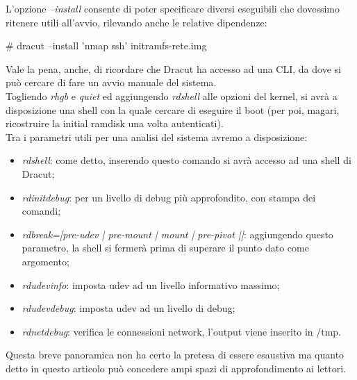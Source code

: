 L'opzione {\itshape --install} consente di poter specificare diversi eseguibili che dovessimo ritenere utili all'avvio, rilevando anche le relative dipendenze:

\begin{shaded}
{\color[cmyk]{0, 0, 0, 0}\# dracut --install 'nmap ssh' initramfs-rete.img}
\end{shaded}

Vale la pena, anche, di ricordare che Dracut ha accesso ad una CLI, da dove si può cercare di fare un avvio manuale del sistema.\\

Togliendo  {\itshape rhgb} e {\itshape quiet} ed aggiungendo {\itshape rdshell} alle opzioni del kernel, si avrà a disposizione una shell con la quale cercare di eseguire il boot (per poi, magari, ricostruire la initial ramdisk una volta autenticati).\\

Tra i parametri utili per una analisi del sistema avremo a disposizione:

\begin{itemize}
 \item {\itshape rdshell}: come detto, inserendo questo comando si avrà accesso ad una shell di Dracut;
 \item {\itshape rdinitdebug}: per un livello di debug più approfondito, con stampa dei comandi;
 \item {\itshape rdbreak=[pre-udev | pre-mount | mount | pre-pivot |]}: aggiungendo questo parametro, la shell si fermerà prima di superare il punto dato come argomento;
 \item {\itshape rdudevinfo}: imposta udev ad un livello informativo massimo;
 \item {\itshape rdudevdebug}: imposta udev ad un livello di debug;
 \item {\itshape rdnetdebug}: verifica le connessioni network, l'output viene inserito in /tmp.
\end{itemize}

Questa breve panoramica non ha certo la pretesa di essere esaustiva ma quanto detto in questo articolo può concedere ampi spazi di approfondimento ai lettori.\\
